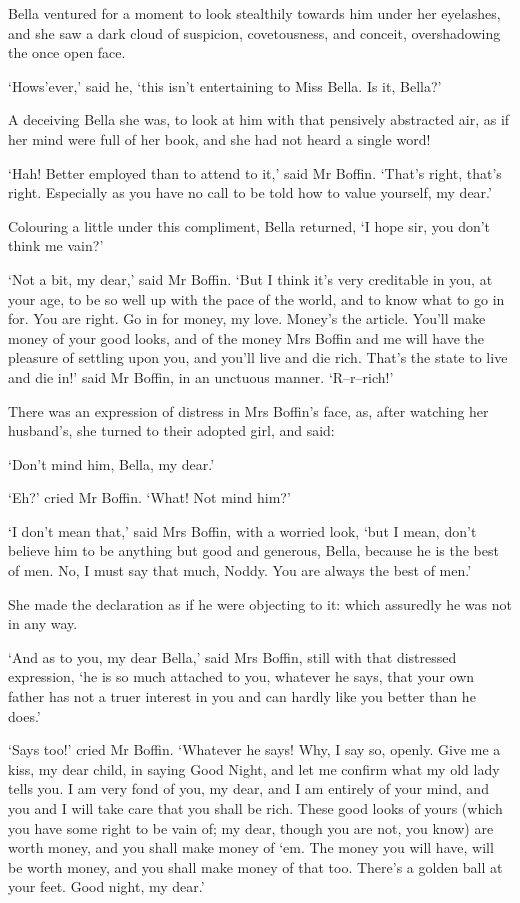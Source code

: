 Bella ventured for a moment to look stealthily towards him under her
eyelashes, and she saw a dark cloud of suspicion, covetousness, and
conceit, overshadowing the once open face.

‘Hows’ever,’ said he, ‘this isn’t entertaining to Miss Bella. Is it,
Bella?’

A deceiving Bella she was, to look at him with that pensively abstracted
air, as if her mind were full of her book, and she had not heard a
single word!

‘Hah! Better employed than to attend to it,’ said Mr Boffin. ‘That’s
right, that’s right. Especially as you have no call to be told how to
value yourself, my dear.’

Colouring a little under this compliment, Bella returned, ‘I hope sir,
you don’t think me vain?’

‘Not a bit, my dear,’ said Mr Boffin. ‘But I think it’s very creditable
in you, at your age, to be so well up with the pace of the world, and to
know what to go in for. You are right. Go in for money, my love. Money’s
the article. You’ll make money of your good looks, and of the money Mrs
Boffin and me will have the pleasure of settling upon you, and you’ll
live and die rich. That’s the state to live and die in!’ said Mr Boffin,
in an unctuous manner. ‘R--r--rich!’

There was an expression of distress in Mrs Boffin’s face, as, after
watching her husband’s, she turned to their adopted girl, and said:

‘Don’t mind him, Bella, my dear.’

‘Eh?’ cried Mr Boffin. ‘What! Not mind him?’

‘I don’t mean that,’ said Mrs Boffin, with a worried look, ‘but I mean,
don’t believe him to be anything but good and generous, Bella, because
he is the best of men. No, I must say that much, Noddy. You are always
the best of men.’

She made the declaration as if he were objecting to it: which assuredly
he was not in any way.

‘And as to you, my dear Bella,’ said Mrs Boffin, still with that
distressed expression, ‘he is so much attached to you, whatever he says,
that your own father has not a truer interest in you and can hardly like
you better than he does.’

‘Says too!’ cried Mr Boffin. ‘Whatever he says! Why, I say so, openly.
Give me a kiss, my dear child, in saying Good Night, and let me confirm
what my old lady tells you. I am very fond of you, my dear, and I am
entirely of your mind, and you and I will take care that you shall be
rich. These good looks of yours (which you have some right to be vain
of; my dear, though you are not, you know) are worth money, and you
shall make money of ‘em. The money you will have, will be worth money,
and you shall make money of that too. There’s a golden ball at your
feet. Good night, my dear.’

